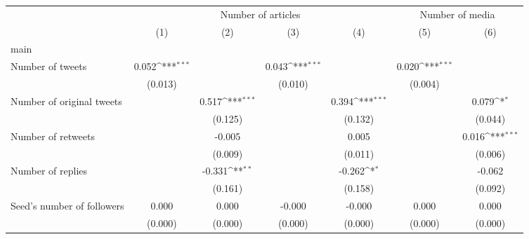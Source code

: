 {
\def\sym#1{\ifmmode^{#1}\else\(^{#1}\)\fi}
\begin{tabular}{l*{6}{c}}
\hline\hline
                    &\multicolumn{4}{c}{Number of articles}                                                 &\multicolumn{2}{c}{Number of media}        \\\cmidrule(lr){2-5}\cmidrule(lr){6-7}
                    &\multicolumn{1}{c}{(1)}         &\multicolumn{1}{c}{(2)}         &\multicolumn{1}{c}{(3)}         &\multicolumn{1}{c}{(4)}         &\multicolumn{1}{c}{(5)}         &\multicolumn{1}{c}{(6)}         \\
\hline
main                &                     &                     &                     &                     &                     &                     \\
Number of tweets    &       0.052\sym{***}&                     &       0.043\sym{***}&                     &       0.020\sym{***}&                     \\
                    &     (0.013)         &                     &     (0.010)         &                     &     (0.004)         &                     \\
Number of original tweets&                     &       0.517\sym{***}&                     &       0.394\sym{***}&                     &       0.079\sym{*}  \\
                    &                     &     (0.125)         &                     &     (0.132)         &                     &     (0.044)         \\
Number of retweets  &                     &      -0.005         &                     &       0.005         &                     &       0.016\sym{***}\\
                    &                     &     (0.009)         &                     &     (0.011)         &                     &     (0.006)         \\
Number of replies   &                     &      -0.331\sym{**} &                     &      -0.262\sym{*}  &                     &      -0.062         \\
                    &                     &     (0.161)         &                     &     (0.158)         &                     &     (0.092)         \\
Seed's number of followers&       0.000         &       0.000         &      -0.000         &      -0.000         &       0.000         &       0.000         \\
                    &     (0.000)         &     (0.000)         &     (0.000)         &     (0.000)         &     (0.000)         &     (0.000)         \\

\end{tabular}}
